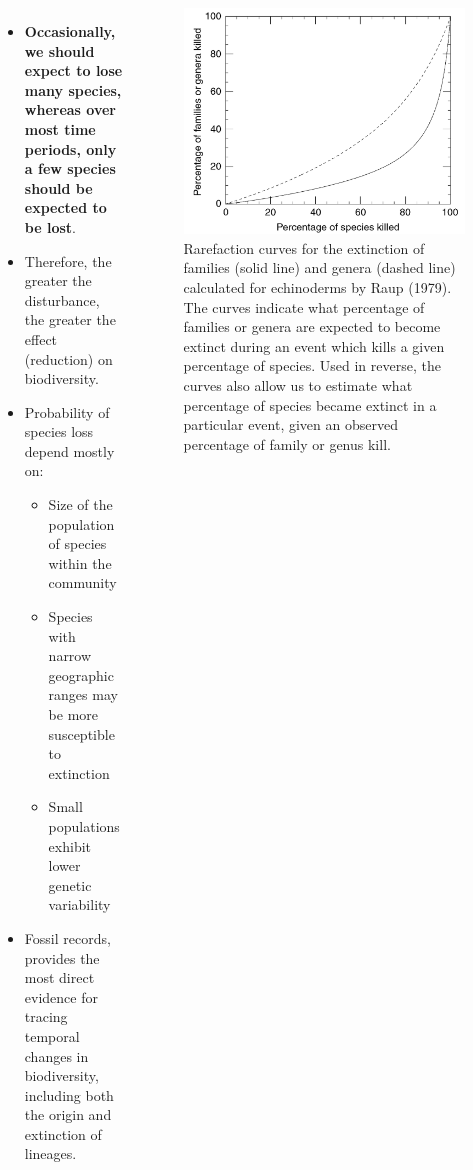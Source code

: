 \documentclass[
  ignorenonframetext,
  aspectratio=169]{beamer}
\providecommand{\tightlist}{%
  \setlength{\itemsep}{0pt}\setlength{\parskip}{0pt}}
\newcommand{\bcolumns}{\begin{columns}[T, onlytextwidth]}
\newcommand{\ecolumns}{\end{columns}}
\begin{document}
\begin{frame}{}
\protect\hypertarget{section-2}{}
\bcolumns
{}

\begin{itemize}
\tightlist
\item
  \textbf{Occasionally, we should expect to lose many species, whereas
  over most time periods, only a few species should be expected to be
  lost}.
\item
  Therefore, the greater the disturbance, the greater the effect
  (reduction) on biodiversity.
\item
  Probability of species loss depend mostly on:

  \begin{itemize}
  \tightlist
  \item
    Size of the population of species within the community
  \item
    Species with narrow geographic ranges may be more susceptible to
    extinction
  \item
    Small populations exhibit lower genetic variability
  \end{itemize}
\item
  Fossil records, provides the most direct evidence for tracing temporal
  changes in biodiversity, including both the origin and extinction of
  lineages.
\end{itemize}


\begin{figure}
\includegraphics[width=0.7\linewidth]{../images/rarefaction_curve} \caption{Rarefaction curves for the extinction of families (solid line) and genera (dashed line) calculated for echinoderms by Raup (1979). The curves indicate what percentage of families or genera are expected to become extinct during an event which kills a given percentage of species. Used in reverse, the curves also allow us to estimate what percentage of species became extinct in a particular event, given an observed percentage of family or genus kill.}\label{fig:rarefaction-curve}
\end{figure}

\ecolumns
\end{frame}
\end{document}
